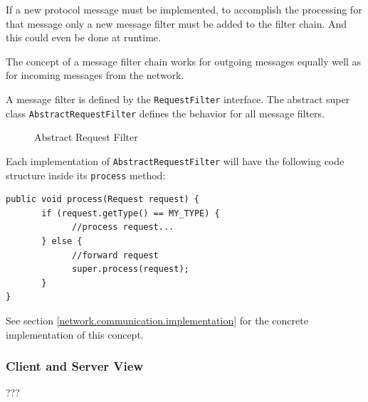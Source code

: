 If a new protocol message must be implemented, to accomplish the processing for that message only a new message filter must be added to the filter chain. And this could even be done at runtime.

The concept of a message filter chain works for outgoing messages equally well as for incoming messages from the network. 

A message filter is defined by the \texttt{RequestFilter} interface. The abstract super class \texttt{AbstractRequestFilter} defines the behavior for all message filters.

\begin{figure}[H]
 \centering
 \caption{Abstract Request Filter}
 \label{fig:network.discovery.abstractrequestfilter.uml}
\end{figure}


Each implementation of \texttt{AbstractRequestFilter} will have the following code structure inside its \texttt{process} method:

\begin{verbatim}
public void process(Request request) {
       if (request.getType() == MY_TYPE) {
             //process request...
       } else { 
             //forward request
             super.process(request);
       }
}
\end{verbatim}

See section \ref{network.communication.implementation} for the concrete implementation of this concept.

\subsubsection{Client and Server View}
???



